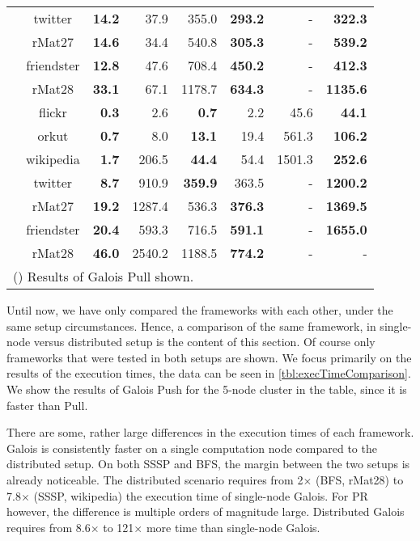 \begin{table}
\begin{tabular}{ccr@{\tabskip 1 \tabcolsep}r
	r@{\tabskip 1 \tabcolsep}r
	r@{\tabskip 1 \tabcolsep}r}
		& twitter & \bf 14.2 & 37.9 & 355.0 & \bf 293.2 & - & \bf 322.3 \\
		& rMat27 & \bf 14.6 & 34.4 & 540.8 & \bf 305.3 & - & \bf 539.2 \\
		& friendster & \bf 12.8 & 47.6 & 708.4 & \bf 450.2 & - & \bf 412.3 \\
		& rMat28 & \bf 33.1 & 67.1 & 1178.7 & \bf 634.3 & - & \bf 1135.6 \\
		\midrule
		\multirow{7}{0.5ex}{\rotatebox{90}{\bf PR}}& flickr & \bf 0.3\txtdagger & 2.6 & \bf 0.7 & 2.2 & 45.6 & \bf 44.1 \\
		& orkut & \bf 0.7\txtdagger & 8.0 & \bf 13.1 & 19.4 & 561.3 & \bf 106.2 \\
		& wikipedia & \bf 1.7\txtdagger & 206.5 & \bf 44.4 & 54.4 & 1501.3 & \bf 252.6 \\
		& twitter & \bf 8.7\txtdagger & 910.9 & \bf 359.9 & 363.5 & - & \bf 1200.2 \\
		& rMat27 & \bf 19.2\txtdagger & 1287.4 & 536.3 & \bf 376.3 & - & \bf 1369.5 \\
		& friendster & \bf 20.4\txtdagger & 593.3 & 716.5 & \bf 591.1 & - & \bf 1655.0 \\
		& rMat28 & \bf 46.0\txtdagger & 2540.2 & 1188.5 & \bf 774.2 & - & - \\
		\bottomrule
		\multicolumn{8}{l}{(\txtdagger) Results of Galois Pull shown.}
	\end{tabular}
\end{table}
Until now, we have only compared the frameworks with each other, under the same setup circumstances. Hence, a comparison of the same framework, in single-node versus distributed setup is the content of this section.
Of course only frameworks that were tested in both setups are shown.
We focus primarily on the results of the execution times, the data can be seen in \autoref{tbl:execTimeComparison}. We show the results of Galois Push for the 5-node cluster in the table, since it is faster than Pull.

There are some, rather large differences in the execution times of each framework. Galois is consistently faster on a single computation node compared to the distributed setup. 
On both SSSP and BFS, the margin between the two setups is already noticeable. The distributed scenario requires from 2$\times$ (BFS, rMat28) to 7.8$\times$ (SSSP, wikipedia) the execution time of single-node Galois.
For PR however, the difference is multiple orders of magnitude large. Distributed Galois requires from 8.6$\times$ to 121$\times$ more time than single-node Galois. 

